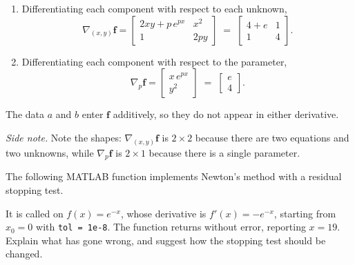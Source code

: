 \begin{solution}
    
    \begin{enumerate}[label=(\alph*)]
        \item Differentiating each component with respect to each unknown,
        \[
            \nabla_{(x,y)} \mathbf{f} =
            \begin{bmatrix}
                2xy + p\,e^{px} & x^2 \\
                1 & 2py
            \end{bmatrix}
            \;=\;
            \begin{bmatrix}
                4 + e & 1 \\
                1 & 4
            \end{bmatrix}.
        \]
        \item Differentiating each component with respect to the parameter,
        \[
            \nabla_{p} \mathbf{f} =
            \begin{bmatrix}
                x\,e^{px} \\
                y^2
            \end{bmatrix}
            \;=\;
            \begin{bmatrix}
                e \\ 4
            \end{bmatrix}.
        \]
    \end{enumerate}
    The data $a$ and $b$ enter $\mathbf{f}$ additively, so they do not appear in either derivative.

    \emph{Side note.} Note the shapes: $\nabla_{(x,y)}\mathbf{f}$ is $2 \times 2$ because there are two equations and two unknowns, while $\nabla_p \mathbf{f}$ is $2 \times 1$ because there is a single parameter. 
    
\end{solution}

\begin{exercise} %
    
    The following MATLAB function implements Newton's method with a residual stopping test.
    
    It is called on $f(x) = e^{-x}$, whose derivative is $f'(x) = -e^{-x}$, starting from $x_0 = 0$ with \texttt{tol = 1e-8}. The function returns without error, reporting $x = 19$. Explain what has gone wrong, and suggest how the stopping test should be changed.
    
\end{exercise}

